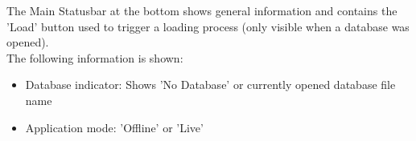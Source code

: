 The Main Statusbar at the bottom shows general information and contains the 'Load' button used to trigger a loading process (only visible when a database was opened). \\

The following information is shown:

\begin{itemize}
 \item Database indicator: Shows 'No Database' or currently opened database file name
 \item Application mode: 'Offline' or 'Live'
\end{itemize}
\  \\
